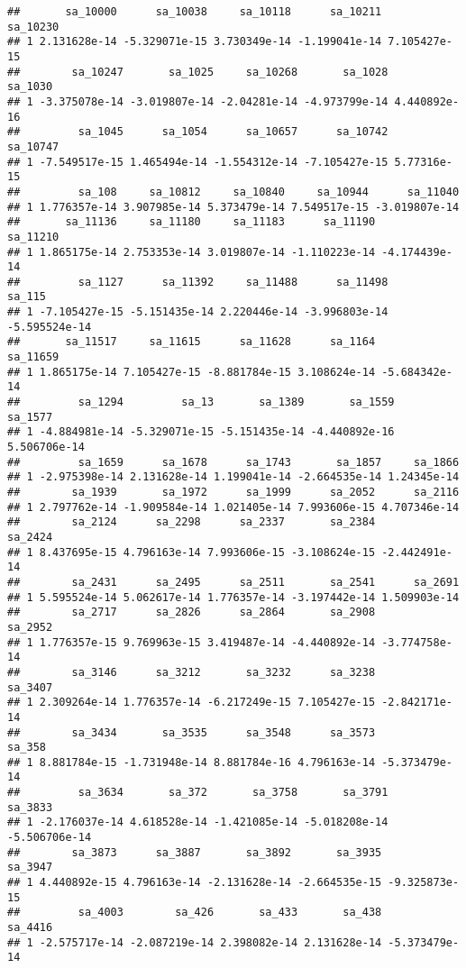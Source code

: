 \documentclass[]{article}
\begin{document}
\begin{verbatim}
##       sa_10000      sa_10038     sa_10118      sa_10211     sa_10230
## 1 2.131628e-14 -5.329071e-15 3.730349e-14 -1.199041e-14 7.105427e-15
##        sa_10247       sa_1025     sa_10268       sa_1028      sa_1030
## 1 -3.375078e-14 -3.019807e-14 -2.04281e-14 -4.973799e-14 4.440892e-16
##         sa_1045      sa_1054      sa_10657      sa_10742    sa_10747
## 1 -7.549517e-15 1.465494e-14 -1.554312e-14 -7.105427e-15 5.77316e-15
##         sa_108     sa_10812     sa_10840     sa_10944      sa_11040
## 1 1.776357e-14 3.907985e-14 5.373479e-14 7.549517e-15 -3.019807e-14
##       sa_11136     sa_11180     sa_11183      sa_11190      sa_11210
## 1 1.865175e-14 2.753353e-14 3.019807e-14 -1.110223e-14 -4.174439e-14
##         sa_1127      sa_11392     sa_11488      sa_11498        sa_115
## 1 -7.105427e-15 -5.151435e-14 2.220446e-14 -3.996803e-14 -5.595524e-14
##       sa_11517     sa_11615      sa_11628      sa_1164      sa_11659
## 1 1.865175e-14 7.105427e-15 -8.881784e-15 3.108624e-14 -5.684342e-14
##         sa_1294         sa_13       sa_1389       sa_1559      sa_1577
## 1 -4.884981e-14 -5.329071e-15 -5.151435e-14 -4.440892e-16 5.506706e-14
##         sa_1659      sa_1678      sa_1743       sa_1857     sa_1866
## 1 -2.975398e-14 2.131628e-14 1.199041e-14 -2.664535e-14 1.24345e-14
##        sa_1939       sa_1972      sa_1999      sa_2052      sa_2116
## 1 2.797762e-14 -1.909584e-14 1.021405e-14 7.993606e-15 4.707346e-14
##        sa_2124      sa_2298      sa_2337       sa_2384       sa_2424
## 1 8.437695e-15 4.796163e-14 7.993606e-15 -3.108624e-15 -2.442491e-14
##        sa_2431      sa_2495      sa_2511       sa_2541      sa_2691
## 1 5.595524e-14 5.062617e-14 1.776357e-14 -3.197442e-14 1.509903e-14
##        sa_2717      sa_2826      sa_2864       sa_2908       sa_2952
## 1 1.776357e-15 9.769963e-15 3.419487e-14 -4.440892e-14 -3.774758e-14
##        sa_3146      sa_3212       sa_3232      sa_3238       sa_3407
## 1 2.309264e-14 1.776357e-14 -6.217249e-15 7.105427e-15 -2.842171e-14
##        sa_3434       sa_3535      sa_3548      sa_3573        sa_358
## 1 8.881784e-15 -1.731948e-14 8.881784e-16 4.796163e-14 -5.373479e-14
##         sa_3634       sa_372       sa_3758       sa_3791       sa_3833
## 1 -2.176037e-14 4.618528e-14 -1.421085e-14 -5.018208e-14 -5.506706e-14
##        sa_3873      sa_3887       sa_3892       sa_3935       sa_3947
## 1 4.440892e-15 4.796163e-14 -2.131628e-14 -2.664535e-15 -9.325873e-15
##         sa_4003        sa_426       sa_433       sa_438       sa_4416
## 1 -2.575717e-14 -2.087219e-14 2.398082e-14 2.131628e-14 -5.373479e-14

\end{verbatim}
\end{document}
